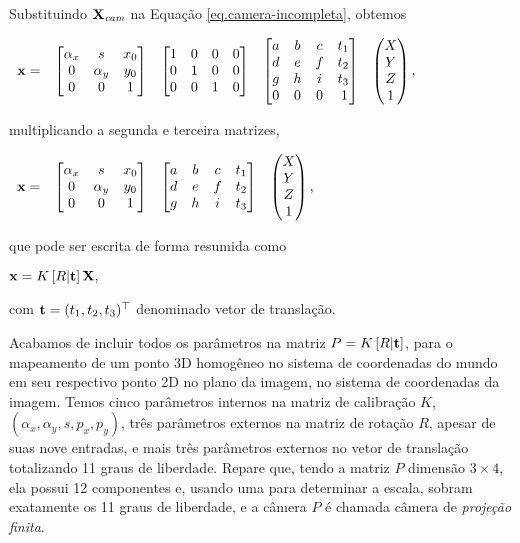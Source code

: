 Substituindo $\mathbf{X}_{\textit{cam}}$ na Equação \ref{eq.camera-incompleta}, obtemos
\begin{center}
$
\begin{array}{ccccc}
\mathbf{x}=
&
\begin{bmatrix}
\alpha_x&s&x_0\\
0&\alpha_y&y_0\\
0&0&1
\end{bmatrix}&
\begin{bmatrix}
1&0&0&0\\
0&1&0&0\\
0&0&1&0
\end{bmatrix}
&
\begin{bmatrix}
a&b&c&t_1\\
d&e&f&t_2\\
g&h&i&t_3\\
0&0&0&\,1
\end{bmatrix}
&
\begin{pmatrix}
X\\
Y\\
Z\\
1
\end{pmatrix},
\end{array}
$
\end{center}
multiplicando a segunda e terceira matrizes,
\begin{center}
$
\begin{array}{cccc}
\mathbf{x}=
&
\begin{bmatrix}
\alpha_x&s&x_0\\
0&\alpha_y&y_0\\
0&0&1
\end{bmatrix}&
\begin{bmatrix}
a&b&c&t_1\\
d&e&f&t_2\\
g&h&i&t_3
\end{bmatrix}
&
\begin{pmatrix}
X\\
Y\\
Z\\
1
\end{pmatrix},
\end{array}
$
\end{center}
que pode ser escrita de forma resumida como
\begin{center}
$
\mathbf{x}=K\,[R|{\bf t}]\,\mathbf{X},
$
\end{center}
com ${\bf t}=(t_1,t_2,t_3)^\top$ denominado vetor de translação.

Acabamos de incluir todos os parâmetros na matriz $P=K\,[R|{\bf t}]$, para o mapeamento de um ponto 3D homogêneo no sistema de coordenadas do mundo em seu respectivo ponto 2D no plano da imagem, no sistema de coordenadas da imagem. Temos cinco parâmetros internos na matriz de calibração $K$, $(\alpha_x,\alpha_y,s,p_x,p_y)$, três parâmetros externos na matriz de rotação $R$, apesar de suas nove entradas, e mais três parâmetros externos no vetor de translação totalizando 11 graus de liberdade. Repare que, tendo a matriz $P$ dimensão $3\times4$, ela possui 12 componentes e, usando uma para determinar a escala, sobram exatamente os 11 graus de liberdade, e a câmera $P$ é chamada câmera de \textit{projeção finita}.

